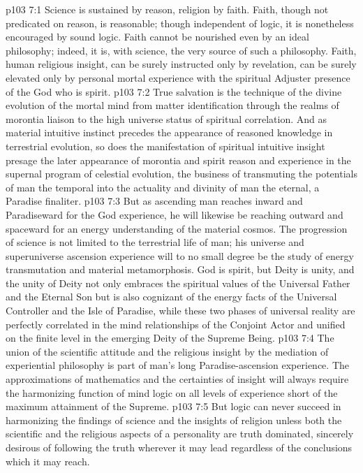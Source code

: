 \vs p103 7:1 Science is sustained by reason, religion by faith. Faith, though not predicated on reason, is reasonable; though independent of logic, it is nonetheless encouraged by sound logic. Faith cannot be nourished even by an ideal philosophy; indeed, it is, with science, the very source of such a philosophy. Faith, human religious insight, can be surely instructed only by revelation, can be surely elevated only by personal mortal experience with the spiritual Adjuster presence of the God who is spirit.
\pc \vs p103 7:2 True salvation is the technique of the divine evolution of the mortal mind from matter identification through the realms of morontia liaison to the high universe status of spiritual correlation. And as material intuitive instinct precedes the appearance of reasoned knowledge in terrestrial evolution, so does the manifestation of spiritual intuitive insight presage the later appearance of morontia and spirit reason and experience in the supernal program of celestial evolution, the business of transmuting the potentials of man the temporal into the actuality and divinity of man the eternal, a Paradise finaliter.
\vs p103 7:3 But as ascending man reaches inward and Paradiseward for the God experience, he will likewise be reaching outward and spaceward for an energy understanding of the material cosmos. The progression of science is not limited to the terrestrial life of man; his universe and superuniverse ascension experience will to no small degree be the study of energy transmutation and material metamorphosis. God is spirit, but Deity is unity, and the unity of Deity not only embraces the spiritual values of the Universal Father and the Eternal Son but is also cognizant of the energy facts of the Universal Controller and the Isle of Paradise, while these two phases of universal reality are perfectly correlated in the mind relationships of the Conjoint Actor and unified on the finite level in the emerging Deity of the Supreme Being.
\pc \vs p103 7:4 The union of the scientific attitude and the religious insight by the mediation of experiential philosophy is part of man’s long Paradise\hyp{}ascension experience. The approximations of mathematics and the certainties of insight will always require the harmonizing function of mind logic on all levels of experience short of the maximum attainment of the Supreme.
\vs p103 7:5 But logic can never succeed in harmonizing the findings of science and the insights of religion unless both the scientific and the religious aspects of a personality are truth dominated, sincerely desirous of following the truth wherever it may lead regardless of the conclusions which it may reach.
